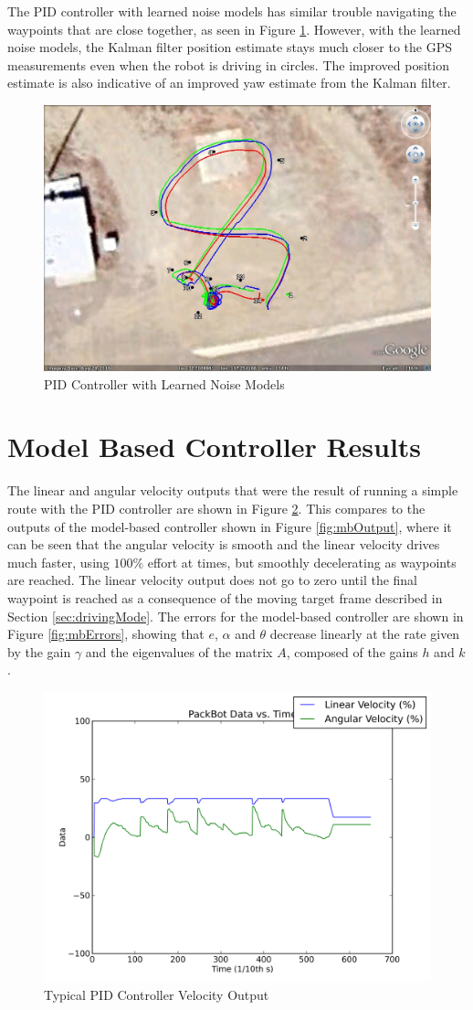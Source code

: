 The PID controller with learned noise models has similar trouble navigating the waypoints that are close together, as seen in Figure \ref{fig:kfResults4}. However, with the learned noise models, the Kalman filter position estimate stays much closer to the GPS measurements even when the robot is driving in circles. The improved position estimate is also indicative of an improved yaw estimate from the Kalman filter.

\begin{figure}[ht!]
	\centering
	\includegraphics[width=.75\textwidth]{images/GE/20101203_1751_kf_pidNewQR}
	\caption{PID Controller with Learned Noise Models}
	\label{fig:kfResults4}
\end{figure}

\section{Model Based Controller Results}
\label{sec:lyapunovResults}
The linear and angular velocity outputs that were the result of running a simple route with the PID controller are shown in Figure \ref{fig:pidOutput}. This compares to the outputs of the model-based controller shown in Figure \ref{fig:mbOutput}, where it can be seen that the angular velocity is smooth and the linear velocity drives much faster, using $100\%$ effort at times, but smoothly decelerating as waypoints are reached. The linear velocity output does not go to zero until the final waypoint is reached as a consequence of the moving target frame described in Section \ref{sec:drivingMode}. The errors for the model-based controller are shown in Figure \ref{fig:mbErrors}, showing that $e$, $\alpha$ and $\theta$ decrease linearly at the rate given by the gain $\gamma$ and the eigenvalues of the matrix $A$, composed of the gains $h$ and $k$.

\begin{figure}[ht!]
	\centering
	\includegraphics[width=.5\textwidth]{images/pbtx/20110109_1815_pbtx_simpleDrivePID}
	\caption{Typical PID Controller Velocity Output}
	\label{fig:pidOutput}
\end{figure}

